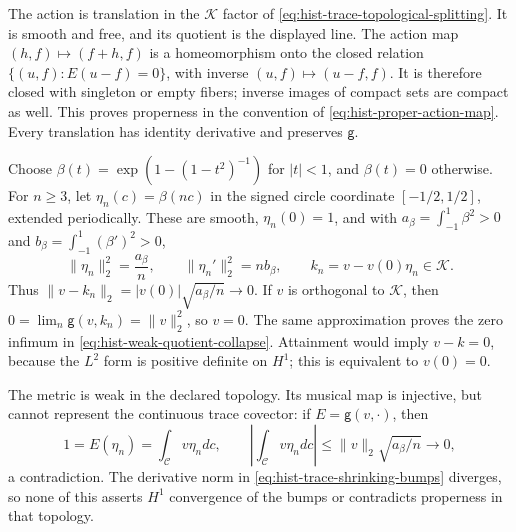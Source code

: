 The action is translation in the \(\mathcal K\) factor of
\eqref{eq:hist-trace-topological-splitting}. It is smooth and free,
and its quotient is the displayed line. The action map
\((h,f)\mapsto(f+h,f)\) is a homeomorphism onto the closed relation
\(\{(u,f):E(u-f)=0\}\), with inverse
\((u,f)\mapsto(u-f,f)\). It is therefore closed with singleton or empty
fibers; inverse images of compact sets are compact as well.
This proves properness in the convention of
\eqref{eq:hist-proper-action-map}. Every translation has identity
derivative and preserves \(\mathsf g\).

Choose
\(\beta(t)=\exp(1-(1-t^2)^{-1})\) for \(|t|<1\), and \(\beta(t)=0\)
otherwise. For \(n\geq3\), let \(\eta_n(c)=\beta(nc)\) in the signed
circle coordinate \([-1/2,1/2]\), extended periodically. These are smooth,
\(\eta_n(0)=1\), and with
\(a_\beta=\int_{-1}^1\beta^2>0\) and
\(b_\beta=\int_{-1}^1(\beta')^2>0\),
\begin{equation}
\|\eta_n\|_2^2=\frac{a_\beta}{n},
\qquad
\|\eta_n'\|_2^2=nb_\beta,
\qquad
k_n=v-v(0)\eta_n\in\mathcal K.
\label{eq:hist-trace-shrinking-bumps}
\end{equation}
Thus \(\|v-k_n\|_2=|v(0)|\sqrt{a_\beta/n}\to0\).
If \(v\) is orthogonal to \(\mathcal K\), then
\(0=\lim_n\mathsf g(v,k_n)=\|v\|_2^2\), so \(v=0\).
The same approximation proves the zero infimum in
\eqref{eq:hist-weak-quotient-collapse}. Attainment would imply
\(v-k=0\), because the \(L^2\) form is positive definite on \(H^1\);
this is equivalent to \(v(0)=0\).

The metric is weak in the declared topology. Its musical map is injective,
but cannot represent the continuous trace covector: if
\(E=\mathsf g(v,\cdot)\), then
\begin{equation}
1=E(\eta_n)=\int_{\mathcal C}v\eta_n dc,
\qquad
\left|\int_{\mathcal C}v\eta_n dc\right|
\leq\|v\|_2\sqrt{a_\beta/n}\longrightarrow0,
\label{eq:hist-weak-musical-obstruction}
\end{equation}
a contradiction. The derivative norm in
\eqref{eq:hist-trace-shrinking-bumps} diverges, so none of this asserts
\(H^1\) convergence of the bumps or contradicts properness in that topology.

